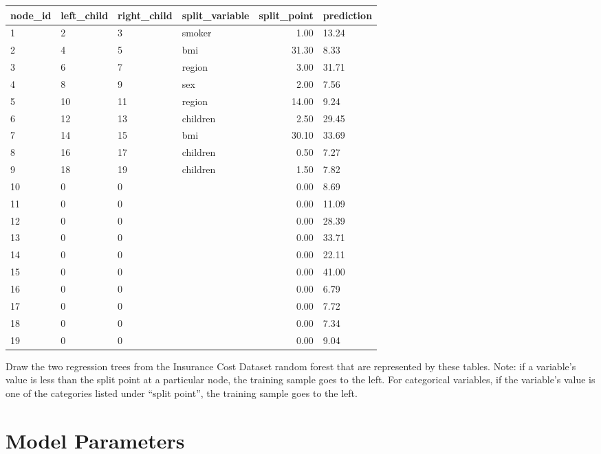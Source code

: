 \begin{center}
{\begin{tabular}{llllrl}
  \hline
 node\_id & left\_child & right\_child & split\_variable & split\_point & prediction \\ 
  \hline
1 & 2 & 3 & smoker & 1.00 & 13.24 \\ 
  2 & 4 & 5 & bmi & 31.30 & 8.33 \\ 
  3 & 6 & 7 & region & 3.00 & 31.71 \\ 
  4 & 8 & 9 & sex & 2.00 & 7.56 \\ 
  5 & 10 & 11 & region & 14.00 & 9.24 \\ 
  6 & 12 & 13 & children & 2.50 & 29.45 \\ 
  7 & 14 & 15 & bmi & 30.10 & 33.69 \\ 
  8 & 16 & 17 & children & 0.50 & 7.27 \\ 
  9 & 18 & 19 & children & 1.50 & 7.82 \\ 
  10 & 0 & 0 &  & 0.00 & 8.69 \\ 
  11 & 0 & 0 &  & 0.00 & 11.09 \\ 
  12 & 0 & 0 &  & 0.00 & 28.39 \\ 
  13 & 0 & 0 &  & 0.00 & 33.71 \\ 
  14 & 0 & 0 &  & 0.00 & 22.11 \\ 
  15 & 0 & 0 &  & 0.00 & 41.00 \\ 
  16 & 0 & 0 &  & 0.00 & 6.79 \\ 
  17 & 0 & 0 &  & 0.00 & 7.72 \\ 
  18 & 0 & 0 &  & 0.00 & 7.34 \\ 
  19 & 0 & 0 &  & 0.00 & 9.04 \\ 
   \hline
\end{tabular}
}
\end{center}

\vspace{3mm}

\begin{question}{}
Draw the two regression trees from the Insurance Cost Dataset random forest that are represented by these tables. Note: if a variable's value is less than the split point at a particular node, the training sample goes to the left. For categorical variables, if the variable's value is one of the categories listed under ``split point'', the training sample goes to the left. 
\end{question}


\section{Model Parameters}

